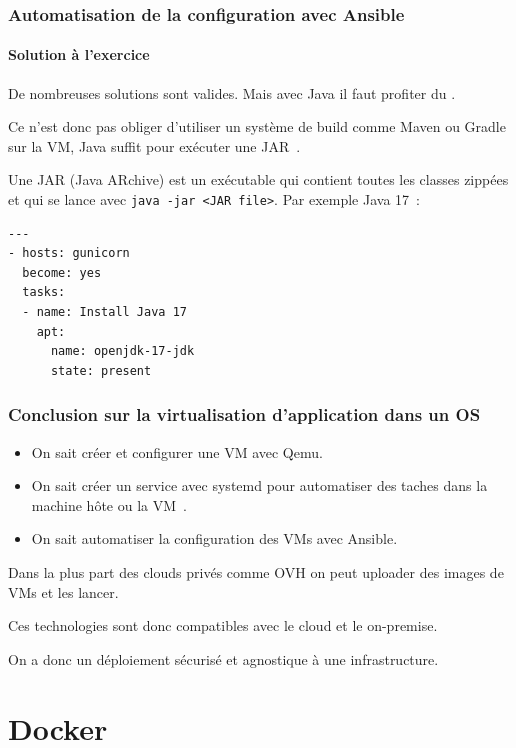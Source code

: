 \documentclass{beamer}
\begin{document}
    \begin{frame}[fragile]
        \transdissolve
        \frametitle{Automatisation de la configuration avec Ansible}
        \framesubtitle{Solution à l'exercice}
        De nombreuses solutions sont valides.
        Mais avec Java il faut profiter du .

        Ce n'est donc pas obliger d'utiliser un système de build comme Maven ou Gradle sur la VM, Java suffit pour exécuter une JAR~.

        Une JAR (Java ARchive) est un exécutable qui contient toutes les classes zippées et qui se lance avec \lstinline{java -jar <JAR file>}.
        \bigbreak
        Par exemple Java 17~:
        \begin{lstlisting}
---
- hosts: gunicorn
  become: yes
  tasks:
  - name: Install Java 17
    apt:
      name: openjdk-17-jdk
      state: present
        \end{lstlisting}
    \end{frame}


    \begin{frame}
        \transdissolve
        \frametitle{Conclusion sur la virtualisation d'application dans un OS}
        \begin{itemize}
            \item On sait créer et configurer une VM avec Qemu.
            \item On sait créer un service avec systemd pour automatiser des taches dans la machine hôte ou la VM~.
            \item On sait automatiser la configuration des VMs avec Ansible.
        \end{itemize}
        \bigbreak
        Dans la plus part des clouds privés comme OVH on peut uploader des images de VMs et les lancer.

        Ces technologies sont donc compatibles avec le cloud et le on-premise.

        On a donc un déploiement sécurisé et agnostique à une infrastructure.
    \end{frame}


    \section{Docker}\label{sec:docker}
\end{document}
